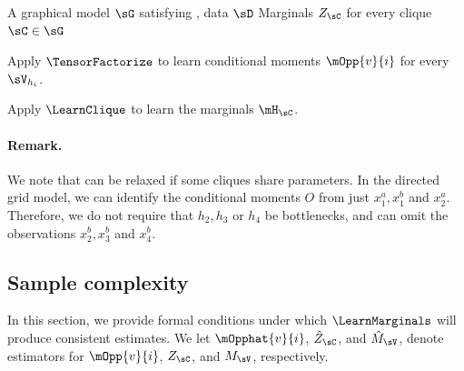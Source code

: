 \renewcommand{\algorithmicrequire}{\textbf{Input:}}
\renewcommand{\algorithmicensure}{\textbf{Output:}}
\begin{algorithm}
  \caption{\LearnMarginals}
  \label{algo:directed}
  \begin{algorithmic}
    \REQUIRE A graphical model $\sG$ satisfying , data $\sD$
    \ENSURE Marginals $Z_\sC$ for every clique $\sC \in \sG$

        \STATE Apply $\TensorFactorize$ to learn conditional moments
        $\mOpp{v}{i}$ for every $\sV_{h_i}$.

      \ENDFOR
\STATE Apply $\LearnClique$ to learn the marginals $\mH_\sC$.
\ENDFOR
  \end{algorithmic}
\end{algorithm}

\paragraph{Remark.} We note that  can be relaxed if some cliques
  share parameters.
In the directed grid model, we can identify the conditional moments $O$ from just
  $x^a_1, x^b_1$ and $x^a_2$.
  Therefore, we do not require that $h_2, h_3$ or $h_4$
  be bottlenecks, and can omit the observations $x^b_2, x^b_3$ and $x^b_4$.

\subsection{Sample complexity}


In this section, we provide formal conditions under which $\LearnMarginals$
will produce consistent estimates.
We let
$\mOpphat{v}{i}$,
$\hat Z_\sC$,
and $\hat M_\sV$,
denote estimators for
$\mOpp{v}{i}$,
$Z_\sC$,
and $M_\sV$,
respectively.

